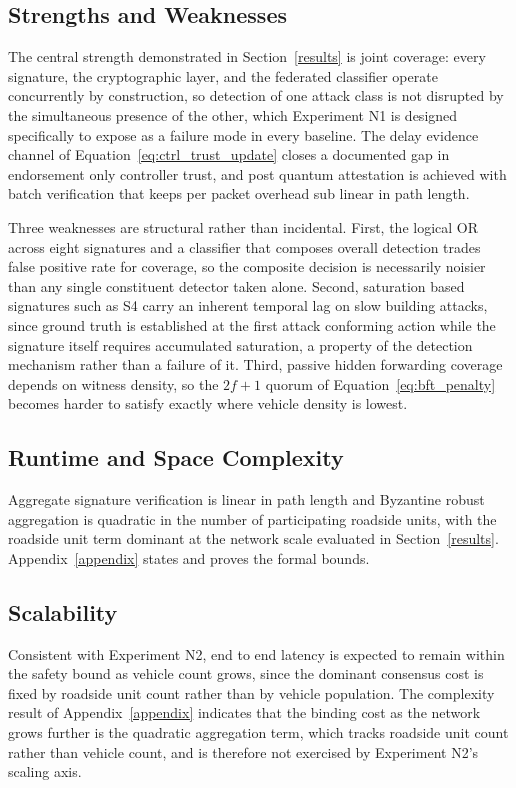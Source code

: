 \documentclass[lettersize,journal]{IEEEtran}
\theoremstyle{plain}
\theoremstyle{remark}
\begin{document}
	\subsection{Strengths and Weaknesses}
	The central strength demonstrated in Section~\ref{results} is joint
	coverage: every signature, the cryptographic layer, and the federated
	classifier operate concurrently by construction, so detection of one
	attack class is not disrupted by the simultaneous presence of the
	other, which Experiment N1 is designed specifically to expose as a
	failure mode in every baseline. The delay evidence channel of
	Equation~\eqref{eq:ctrl_trust_update} closes a documented gap in
	endorsement only controller trust, and post quantum attestation is
	achieved with batch verification that keeps per packet overhead sub
	linear in path length.
	
	Three weaknesses are structural rather than incidental. First, the
	logical OR across eight signatures and a classifier that composes
	overall detection trades false positive rate for coverage, so the
	composite decision is necessarily noisier than any single constituent
	detector taken alone. Second, saturation based signatures such as S4
	carry an inherent temporal lag on slow building attacks, since ground
	truth is established at the first attack conforming action while the
	signature itself requires accumulated saturation, a property of the
	detection mechanism rather than a failure of it. Third, passive hidden
	forwarding coverage depends on witness density, so the $2f{+}1$ quorum
	of Equation~\eqref{eq:bft_penalty} becomes harder to satisfy exactly
	where vehicle density is lowest.
	
	\subsection{Runtime and Space Complexity}
	Aggregate signature verification is linear in path length and Byzantine
	robust aggregation is quadratic in the number of participating roadside
	units, with the roadside unit term dominant at the network scale
	evaluated in Section~\ref{results}. Appendix~\ref{appendix} states and
	proves the formal bounds.
	
	\subsection{Scalability}
	Consistent with Experiment N2, end to end latency is expected to remain
	within the safety bound as vehicle count grows, since the dominant
	consensus cost is fixed by roadside unit count rather than by vehicle
	population. The complexity result of Appendix~\ref{appendix} indicates
	that the binding cost as the network grows further is the quadratic
	aggregation term, which tracks roadside unit count rather than vehicle
	count, and is therefore not exercised by Experiment N2's scaling axis.
	
\end{document}
